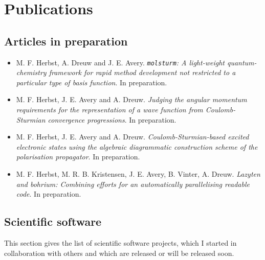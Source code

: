 \chapter*{Publications}
{}

\section*{Articles in preparation}
{}
\begin{itemize}
	\item M. F. Herbst, A. Dreuw and J. E. Avery.
		\textit{\texttt{molsturm}: A light-weight quantum-chemistry framework for rapid method development not restricted to a particular type of basis function}. In preparation.
	\item M. F. Herbst, J. E. Avery and A. Dreuw.
		\textit{Judging the angular momentum requirements for the representation of a wave function from Coulomb-Sturmian convergence progressions}. In preparation.
	\item M. F. Herbst, J. E. Avery and A. Dreuw.
		\textit{Coulomb-Sturmian-based excited electronic states using the algebraic diagrammatic construction scheme of the polarisation propagator}. \linebreak In preparation.
	\item M. F. Herbst, M. R. B. Kristensen, J. E. Avery, B. Vinter, A. Dreuw.
		\textit{Lazyten and bohrium: Combining efforts for an automatically parallelising readable code}. \linebreak In preparation.
\end{itemize}


\section*{Scientific software}
{}
This section gives the list of scientific software projects,
which I started in collaboration with others
and which are released or will be released soon.

